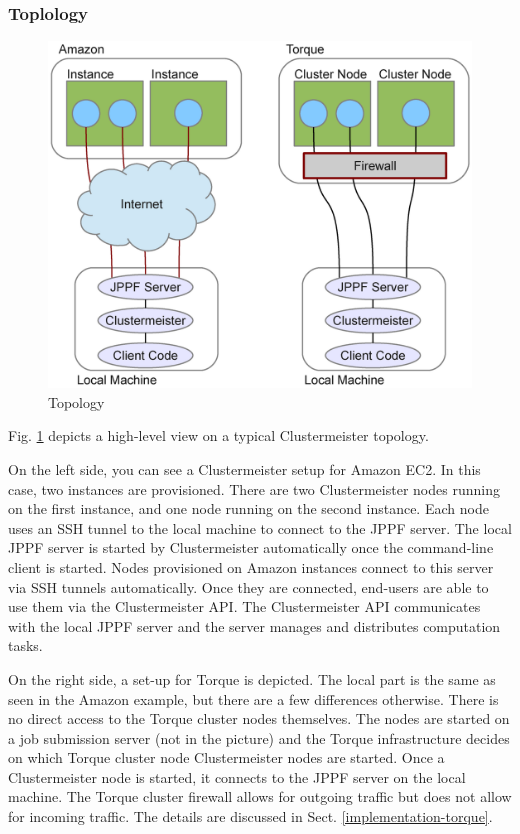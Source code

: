 \documentclass[12pt]{article}
\begin{document}
\subsubsection{Toplology}
\label{topology}

\begin{figure}[h]
\centering
\includegraphics[scale=0.5]{images/topology.pdf}
\caption{Topology}
\label{fig:topology}
\end{figure}

Fig. \ref{fig:topology} depicts a high-level view on a typical Clustermeister topology.

On the left side, you can see a Clustermeister setup for Amazon EC2. In this case, two instances are provisioned. There are two Clustermeister nodes running on the first instance, and one node running on the second instance. Each node uses an SSH tunnel to the local machine to connect to the JPPF server. The local JPPF server is started by Clustermeister automatically once the command-line client is started. Nodes provisioned on Amazon instances connect to this server via SSH tunnels automatically. Once they are connected, end-users are able to use them via the Clustermeister API. The Clustermeister API communicates with the local JPPF server and the server manages and distributes computation tasks.

On the right side, a set-up for Torque is depicted. The local part is the same as seen in the Amazon example, but there are a few differences otherwise. There is no direct access to the Torque cluster nodes themselves. The nodes are started on a job submission server (not in the picture) and the Torque infrastructure decides on which Torque cluster node Clustermeister nodes are started. Once a Clustermeister node is started, it connects to the JPPF server on the local machine. The Torque cluster firewall allows for outgoing traffic but does not allow for incoming traffic. The details are discussed in Sect. \ref{implementation-torque}.
\end{document}
